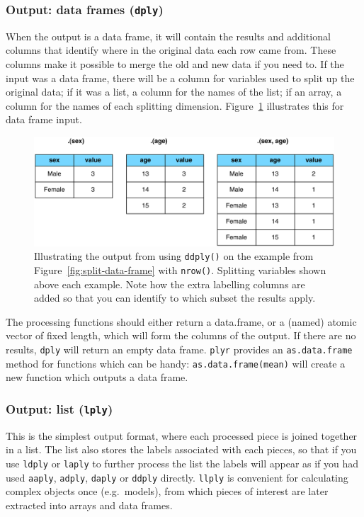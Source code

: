 \documentclass{scrartcl}
\newcommand{\code}[1]{\lstinline!#1!}
\newcommand{\f}[1]{\lstinline!#1()!}
\newcommand{\plyr}{{\tt plyr}\xspace}
\begin{document}
\subsubsection{Output: data frames ({\tt *dply})}

When the output is a data frame, it will contain the results and additional columns that identify where in the original data each row came from.  These columns make it possible to merge the old and new data if you need to.  If the input was a data frame, there will be a column for variables used to split up the original data; if it was a list, a column for the names of the list; if an array, a column for the names of each splitting dimension.  Figure~\ref{fig:output-d} illustrates this for data frame input.

\begin{figure}[htbp]
  \centering
    \includegraphics[width = 0.8 \textwidth]{output-d}
  \caption{Illustrating the output from using \f{ddply} on the example from Figure~\ref{fig:split-data-frame} with \f{nrow}.  Splitting variables shown above each example.  Note how the extra labelling columns are added so that you can identify to which subset the results apply.}
  \label{fig:output-d}
\end{figure}

The processing functions should either return a data.frame, or a (named) atomic vector of fixed length, which will form the columns of the output. If there are no results, {\tt *dply} will return an empty data frame.  \plyr provides an \code{as.data.frame} method for functions which can be handy: \code{as.data.frame(mean)} will create a new function which outputs a data frame.


\subsubsection{Output: list ({\tt *lply})}

This is the simplest output format, where each processed piece is joined together in a list.  The list also stores the labels associated with each pieces, so that if you use {\tt ldply} or {\tt laply} to further process the list the labels will appear as if you had used {\tt aaply}, {\tt adply}, {\tt daply} or {\tt ddply} directly.  {\tt llply} is convenient for calculating complex objects once (e.g.\ models), from which pieces of interest are later extracted into arrays and data frames.
\end{document}
